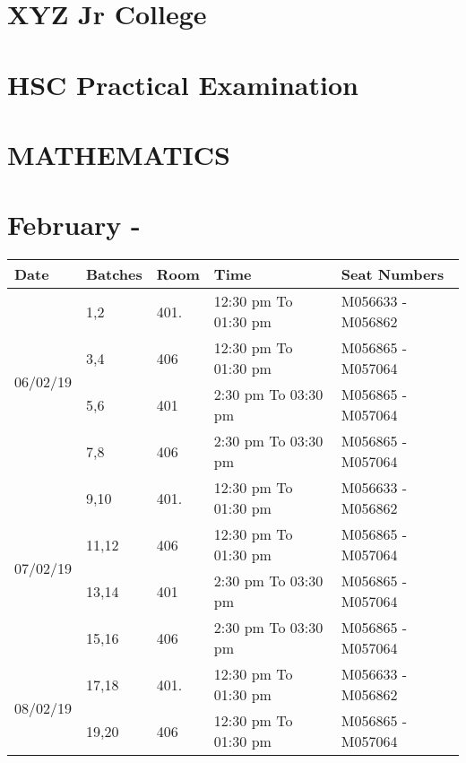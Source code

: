 \documentclass[14pt]{extarticle}
\begin{document}
\section*{XYZ Jr College}
\section*{HSC Practical Examination }
\section*{MATHEMATICS}
\section*{February - \the\year }
\begin{tabular}{ | m{2.5cm} | m{1.8cm}|m{1.4cm}| m{4.8cm} |  m{5cm} | } 
  \hline
  Date
  &Batches
  &Room
  &Time
  & Seat Numbers \\ 
  
   
  \hline
  \multirow{4}{*}{06/02/19 }
  &1,2
  &401.
  &12:30 pm To 01:30 pm 
  &M056633 - M056862 
  \\\cline{2-5}
  
  & 3,4
  &406
  & 12:30 pm To 01:30 pm
  & M056865 - M057064 
  \\\cline{2-5}
  
  & 5,6
  &401
  & 2:30 pm To 03:30 pm
  & M056865 - M057064 
  \\\cline{2-5}
  
  & 7,8
  &406
  & 2:30 pm To 03:30 pm
  & M056865 - M057064
  \\ 
  \hline


   
  
  \multirow{4}{*}{07/02/19 }
  &9,10
  &401.
  &12:30 pm To 01:30 pm 
  &M056633 - M056862 
  \\\cline{2-5}
  
  & 11,12
  &406
  & 12:30 pm To 01:30 pm
  & M056865 - M057064 
  \\\cline{2-5}
  
  & 13,14
  &401
  & 2:30 pm To 03:30 pm
  & M056865 - M057064 
  \\\cline{2-5}
  
  & 15,16
  &406
  & 2:30 pm To 03:30 pm
  & M056865 - M057064
  \\ 
  \hline

   
  
  \multirow{2}{*}{08/02/19 }
  &17,18
  &401.
  &12:30 pm To 01:30 pm 
  &M056633 - M056862 
  \\\cline{2-5}
  
  & 19,20
  &406
  & 12:30 pm To 01:30 pm
  & M056865 - M057064 
 \\ 
  \hline

   

\end{tabular}
\vspace{1cm}
\end{document}
